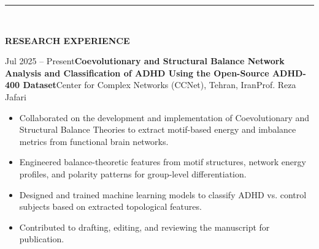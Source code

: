 \documentclass[12pt, b4paper]{cv}
\begin{document}
\vspace{-0.15in}
\rule{\textwidth}{1pt}\\
\vspace{-0.15in}

{\Large \textbf{RESEARCH EXPERIENCE}}
\vspace{0.1in}

\begin{research_exp}{Jul 2025 -- Present}{\textbf{Coevolutionary and Structural Balance Network Analysis and Classification of ADHD Using the Open-Source ADHD-400 Dataset}\vspace{5pt}}{Center for Complex Networks (CCNet), Tehran, Iran}{Prof. Reza Jafari}

\vspace{10pt}
\begin{itemize}
    \item Collaborated on the development and implementation of Coevolutionary and Structural Balance Theories to extract motif-based energy and imbalance metrics from functional brain networks.

    \item Engineered balance-theoretic features from motif structures, network energy profiles, and polarity patterns for group-level differentiation.

    \item Designed and trained machine learning models to classify ADHD vs. control subjects based on extracted topological features.

    \item Contributed to drafting, editing, and reviewing the manuscript for publication.
\end{itemize}
\end{research_exp}
\end{document}
